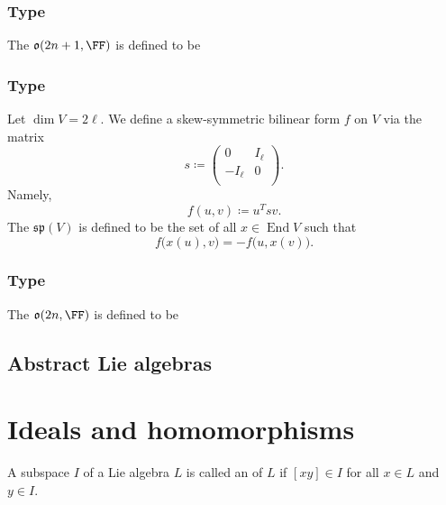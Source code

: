 \documentclass{article}
\newcommand{\lb}[1]{\ensuremath{\left[{#1}\right]}}
\DeclareMathOperator{\End}{End}
\newcommand{\spalg}{\ensuremath{\mathfrak{sp}}}
\newcommand{\oalg}{\ensuremath{\mathfrak{o}}}
\begin{document}
\subsubsection{Type \sfB}

\begin{definition}
    The  $\oalg(2n+1,\FF)$ is defined to be
\end{definition}

\subsubsection{Type \sfC}

\begin{definition}
    Let $\dim V = 2\ell$.
    We define a skew-symmetric bilinear form $f$ on $V$ via the matrix
    \[
        s
        \coloneq
        \begin{pmatrix}
            0 & I_\ell \\
            -I_\ell & 0 \\
        \end{pmatrix}.
    \]
    Namely,
    \[
        f(u,v)
        \coloneq
        u^Tsv.
    \]
    The  $\spalg(V)$ is defined to be the set of all $x \in \End V$ such that
    \[
        f\Big(x(u),v\Big)
        =
        -f\Big(u,x(v)\Big).
    \]
\end{definition}

\subsubsection{Type \sfD}

\begin{definition}
    The  $\oalg(2n,\FF)$ is defined to be
\end{definition}

\subsection{Abstract Lie algebras}

\section{Ideals and homomorphisms}

\begin{definition}
    A subspace $I$ of a Lie algebra $L$ is called an  of $L$ if $\lb{xy} \in I$ for all $x \in L$ and $y \in I$.
\end{definition}
\end{document}
